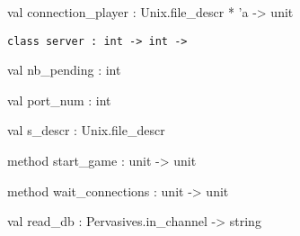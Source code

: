 \documentclass[11pt]{article}
\begin{document}
\label{val:Server.connection-underscoreplayer}\begin{ocamldoccode}
val connection_player : Unix.file_descr * 'a -> unit
\end{ocamldoccode}




\begin{ocamldoccode}
{\tt{class server : }}{\tt{int -> int -> }}\end{ocamldoccode}
\label{class:Server.server}

\begin{ocamldocobjectend}


\label{val:Server.server.nb-underscorepending}\begin{ocamldoccode}
val nb_pending : int
\end{ocamldoccode}


\label{val:Server.server.port-underscorenum}\begin{ocamldoccode}
val port_num : int
\end{ocamldoccode}


\label{val:Server.server.s-underscoredescr}\begin{ocamldoccode}
val s_descr : Unix.file_descr
\end{ocamldoccode}


\label{method:Server.server.start-underscoregame}\begin{ocamldoccode}
method start_game : unit -> unit
\end{ocamldoccode}


\label{method:Server.server.wait-underscoreconnections}\begin{ocamldoccode}
method wait_connections : unit -> unit
\end{ocamldoccode}
\end{ocamldocobjectend}






\label{val:Server.read-underscoredb}\begin{ocamldoccode}
val read_db : Pervasives.in_channel -> string
\end{ocamldoccode}
\end{document}
